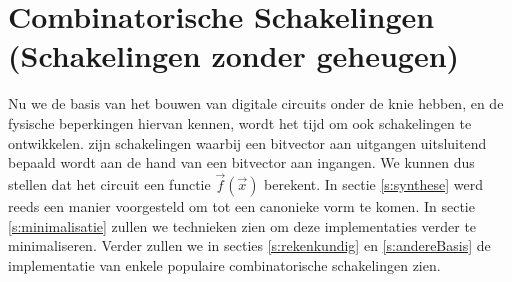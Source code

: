 \chapter{Combinatorische Schakelingen (Schakelingen zonder geheugen)}
\begin{chapterintro}
Nu we de basis van het bouwen van digitale circuits onder de knie hebben, en de fysische beperkingen hiervan kennen, wordt het tijd om ook schakelingen te ontwikkelen.  zijn schakelingen waarbij een bitvector aan uitgangen uitsluitend bepaald wordt aan de hand van een bitvector aan ingangen. We kunnen dus stellen dat het circuit een functie $\vec{f}(\vec{x})$ berekent. In sectie \ref{s:synthese} werd reeds een manier voorgesteld om tot een canonieke vorm te komen. In sectie \ref{s:minimalisatie} zullen we technieken zien om deze implementaties verder te minimaliseren. Verder zullen we in secties \ref{s:rekenkundig} en \ref{s:andereBasis} de implementatie van enkele populaire combinatorische schakelingen zien.%
\end{chapterintro}
\minitoc[n]
